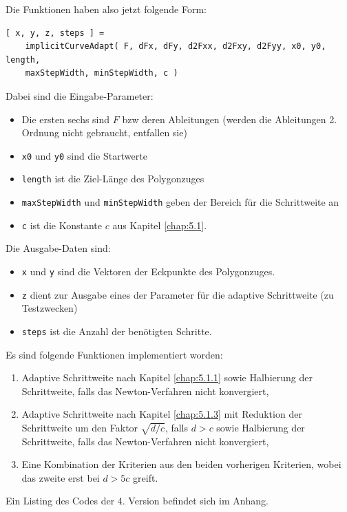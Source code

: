 \documentclass[a4paper,11pt,bibliography=totoc,listof=totoc,headinclude=true,cleardoublepage=empty,oneside]{scrartcl}
\begin{document}
Die Funktionen haben also jetzt folgende Form:
\begin{verbatim}
[ x, y, z, steps ] = 
    implicitCurveAdapt( F, dFx, dFy, d2Fxx, d2Fxy, d2Fyy, x0, y0, length,
    maxStepWidth, minStepWidth, c )
\end{verbatim}
Dabei sind die Eingabe-Parameter:
\begin{itemize}
	\item Die ersten sechs sind $F$ bzw deren Ableitungen (werden die Ableitungen 2. Ordnung nicht gebraucht, entfallen sie)
	\item \verb|x0| und \verb|y0| sind die Startwerte
	\item \verb|length| ist die Ziel-Länge des Polygonzuges
	\item \verb|maxStepWidth| und \verb|minStepWidth| geben der Bereich für die Schrittweite an
	\item \verb|c| ist die Konstante $c$ aus Kapitel \ref{chap:5.1}.
\end{itemize}

Die Ausgabe-Daten sind:
\begin{itemize}
	\item \verb|x| und \verb|y| sind die Vektoren der Eckpunkte des Polygonzuges.
	\item \verb|z| dient zur Ausgabe eines der Parameter für die adaptive Schrittweite (zu Testzwecken)
	\item \verb|steps| ist die Anzahl der benötigten Schritte.
\end{itemize}

Es sind folgende Funktionen implementiert worden:
\begin{enumerate}
	\item Adaptive Schrittweite nach Kapitel \ref{chap:5.1.1} sowie Halbierung der Schrittweite, falls das Newton-Verfahren nicht konvergiert,
	\item Adaptive Schrittweite nach Kapitel \ref{chap:5.1.3} mit Reduktion der Schrittweite um den Faktor $\sqrt{d/c}$, falls $d>c$ sowie Halbierung der Schrittweite, falls das Newton-Verfahren nicht konvergiert,
	\item Eine Kombination der Kriterien aus den beiden vorherigen Kriterien, wobei das zweite erst bei $d>5c$ greift.
\end{enumerate}

Ein Listing des Codes der 4. Version befindet sich im Anhang. 
\end{document}
